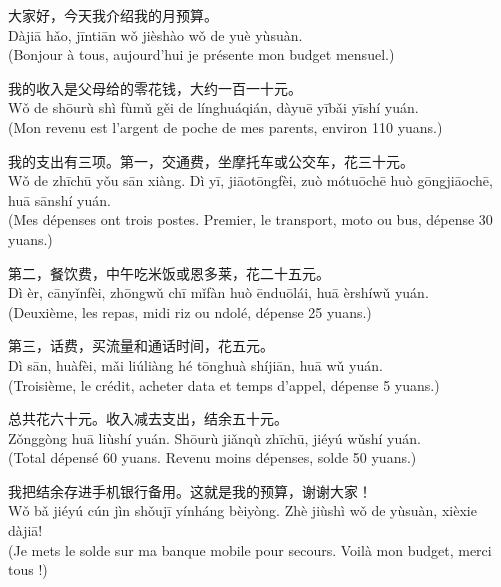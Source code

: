 \documentclass[11pt]{article}
\begin{document}
\begin{textebox}
大家好，今天我介绍我的月预算。\\
Dàjiā hǎo, jīntiān wǒ jièshào wǒ de yuè yùsuàn.\\
(Bonjour à tous, aujourd'hui je présente mon budget mensuel.)

我的收入是父母给的零花钱，大约一百一十元。\\
Wǒ de shōurù shì fùmǔ gěi de línghuáqián, dàyuē yībǎi yīshí yuán.\\
(Mon revenu est l'argent de poche de mes parents, environ 110 yuans.)

我的支出有三项。第一，交通费，坐摩托车或公交车，花三十元。\\
Wǒ de zhīchū yǒu sān xiàng. Dì yī, jiāotōngfèi, zuò mótuōchē huò gōngjiāochē, huā sānshí yuán.\\
(Mes dépenses ont trois postes. Premier, le transport, moto ou bus, dépense 30 yuans.)

第二，餐饮费，中午吃米饭或恩多莱，花二十五元。\\
Dì èr, cānyǐnfèi, zhōngwǔ chī mǐfàn huò ēnduōlái, huā èrshíwǔ yuán.\\
(Deuxième, les repas, midi riz ou ndolé, dépense 25 yuans.)

第三，话费，买流量和通话时间，花五元。\\
Dì sān, huàfèi, mǎi liúliàng hé tōnghuà shíjiān, huā wǔ yuán.\\
(Troisième, le crédit, acheter data et temps d'appel, dépense 5 yuans.)

总共花六十元。收入减去支出，结余五十元。\\
Zǒnggòng huā liùshí yuán. Shōurù jiǎnqù zhīchū, jiéyú wǔshí yuán.\\
(Total dépensé 60 yuans. Revenu moins dépenses, solde 50 yuans.)

我把结余存进手机银行备用。这就是我的预算，谢谢大家！\\
Wǒ bǎ jiéyú cún jìn shǒujī yínháng bèiyòng. Zhè jiùshì wǒ de yùsuàn, xièxie dàjiā!\\
(Je mets le solde sur ma banque mobile pour secours. Voilà mon budget, merci tous !)
\end{textebox}
\end{document}
